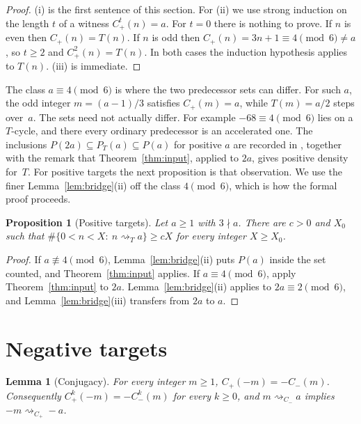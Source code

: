 \documentclass[11pt]{amsart}
\newtheorem{lemma}[theorem]{Lemma}
\newtheorem{proposition}[theorem]{Proposition}
\theoremstyle{definition}
\theoremstyle{remark}
\newcommand{\Cp}{C_{+}}
\newcommand{\Cm}{C_{-}}
\newcommand{\reach}[1]{\mathrel{\rightsquigarrow_{#1}}}
\begin{document}
\begin{proof}
(i) is the first sentence of this section. For (ii) we use strong induction on the length $t$ of a
witness $\Cp^{t}(n)=a$. For $t=0$ there is nothing to prove. If $n$ is even then $\Cp(n)=T(n)$.
If $n$ is odd then $\Cp(n)=3n+1\equiv4\pmod6\ne a$, so $t\ge2$ and $\Cp^{2}(n)=T(n)$. In both cases
the induction hypothesis applies to $T(n)$. (iii) is immediate.
\end{proof}

The class $a\equiv4\pmod6$ is where the two predecessor sets can differ. For such $a$, the odd
integer $m=(a-1)/3$ satisfies $\Cp(m)=a$, while $T(m)=a/2$ steps over~$a$. The sets need not
actually differ. For example $-68\equiv4\pmod6$ lies on a $T$-cycle, and there every ordinary
predecessor is an accelerated one. The inclusions $P(2a)\subseteq P_T(a)\subseteq P(a)$ for
positive $a$ are recorded in \cite[\S1.2, (1.3)]{MazurM2}, together with the remark that
Theorem~\ref{thm:input}, applied to $2a$, gives positive density for~$T$. For positive targets the next proposition is that observation.
We use the finer Lemma~\ref{lem:bridge}(ii) off the class $4\pmod6$, which is how the formal
proof proceeds.

\begin{proposition}[Positive targets]\label{prop:pos}
Let $a\ge1$ with $3\nmid a$. There are $c>0$ and $X_0$ such that
$\#\{0<n<X:\ n\reach{T}a\}\ge cX$ for every integer $X\ge X_0$.
\end{proposition}

\begin{proof}
If $a\not\equiv4\pmod6$, Lemma~\ref{lem:bridge}(ii) puts $P(a)$ inside the set counted, and
Theorem~\ref{thm:input} applies. If $a\equiv4\pmod6$, apply Theorem~\ref{thm:input} to $2a$. Lemma~\ref{lem:bridge}(ii) applies
to $2a\equiv2\pmod6$, and Lemma~\ref{lem:bridge}(iii) transfers from $2a$ to $a$.
\end{proof}

\section{Negative targets}\label{sec:neg}

\begin{lemma}[Conjugacy]\label{lem:conj}
For every integer $m\ge1$, $\Cp(-m)=-\Cm(m)$. Consequently $\Cp^{k}(-m)=-\Cm^{k}(m)$ for every
$k\ge0$, and $m\reach{\Cm}a$ implies $-m\reach{\Cp}-a$.
\end{lemma}
\end{document}
